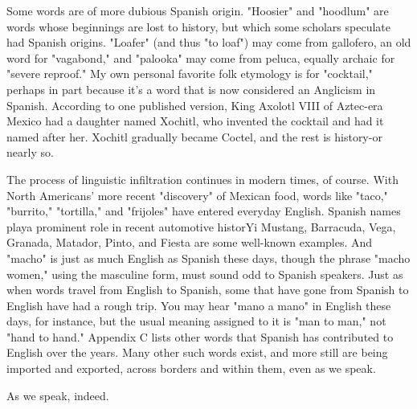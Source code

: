 Some words are of more dubious Spanish origin. "Hoosier" and
"hoodlum" are words whose beginnings are lost to history, but which
some scholars speculate had Spanish origins. "Loafer" (and thus "to
loaf") may come from gallofero, an old word for "vagabond," and "palooka" may come from peluca, equally archaic for "severe reproof."
My own personal favorite folk etymology is for "cocktail," perhaps in
part because it's a word that is now considered an Anglicism in Spanish. According to one published version, King Axolotl VIII of Aztec-era
Mexico had a daughter named Xochitl, who invented the cocktail and
had it named after her. Xochitl gradually became Coctel, and the rest is
history-or nearly so.

The process of linguistic infiltration continues in modern
times, of course. With North Americans' more recent "discovery" of
Mexican food, words like "taco," "burrito," "tortilla," and "frijoles"
have entered everyday English. Spanish names playa prominent role in
recent automotive historYi Mustang, Barracuda, Vega, Granada, Matador, Pinto, and Fiesta are some well-known examples. And "macho" is
just as much English as Spanish these days, though the phrase "macho
women," using the masculine form, must sound odd to Spanish speakers. Just as when words travel from English to Spanish, some that have
gone from Spanish to English have had a rough trip. You may hear "mano
a mano" in English these days, for instance, but the usual meaning assigned to it is "man to man," not "hand to hand." Appendix C lists
other words that Spanish has contributed to English over the years.
Many other such words exist, and more still are being imported and
exported, across borders and within them, even as we speak.

As we speak, indeed.


